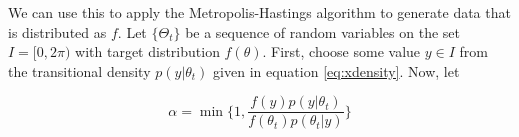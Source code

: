 \documentclass[12pt]{article}
\numberwithin{equation}{section}
\numberwithin{figure}{section}
\begin{document}
We can use this to apply the Metropolis-Hastings algorithm \cite{Metropolis} to generate data that is distributed as $f$. Let $\{\Theta_t\}$ be a sequence of random variables on the set $I = [0,2\pi)$ with target distribution $f(\theta)$. First, choose some value $y \in I$ from the transitional density $p(y|\theta_t)$ given in equation \ref{eq:xdensity}. Now, let

\begin{equation}\label{eq:alpha}
\alpha = \min\{1,\frac{f(y)p(y|\theta_t)}{f(\theta_t)p(\theta_t|y)}\}
\end{equation}

\begin{figure}[h]
\centering
{}
\newline
{}
\end{figure}
\end{document}
